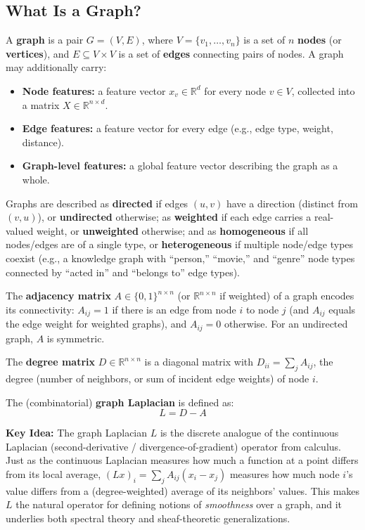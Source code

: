 \documentclass[12pt,a4paper]{article}
\begin{document}
\subsection{What Is a Graph?}

\begin{definition}
A \textbf{graph} is a pair $G = (V, E)$, where $V = \{v_1, \ldots, v_n\}$ is a set of $n$ \textbf{nodes} (or \textbf{vertices}), and $E \subseteq V \times V$ is a set of \textbf{edges} connecting pairs of nodes. A graph may additionally carry:
\begin{itemize}
    \item \textbf{Node features:} a feature vector $x_v \in \mathbb{R}^d$ for every node $v \in V$, collected into a matrix $X \in \mathbb{R}^{n \times d}$.
    \item \textbf{Edge features:} a feature vector for every edge (e.g., edge type, weight, distance).
    \item \textbf{Graph-level features:} a global feature vector describing the graph as a whole.
\end{itemize}
\end{definition}

Graphs are described as \textbf{directed} if edges $(u,v)$ have a direction (distinct from $(v,u)$), or \textbf{undirected} otherwise; as \textbf{weighted} if each edge carries a real-valued weight, or \textbf{unweighted} otherwise; and as \textbf{homogeneous} if all nodes/edges are of a single type, or \textbf{heterogeneous} if multiple node/edge types coexist (e.g., a knowledge graph with ``person,'' ``movie,'' and ``genre'' node types connected by ``acted in'' and ``belongs to'' edge types).

\begin{definition}
The \textbf{adjacency matrix} $A \in \{0,1\}^{n\times n}$ (or $\mathbb{R}^{n\times n}$ if weighted) of a graph encodes its connectivity: $A_{ij} = 1$ if there is an edge from node $i$ to node $j$ (and $A_{ij}$ equals the edge weight for weighted graphs), and $A_{ij}=0$ otherwise. For an undirected graph, $A$ is symmetric.

The \textbf{degree matrix} $D \in \mathbb{R}^{n\times n}$ is a diagonal matrix with $D_{ii} = \sum_j A_{ij}$, the degree (number of neighbors, or sum of incident edge weights) of node $i$.

The (combinatorial) \textbf{graph Laplacian} is defined as:
\[
L = D - A
\]
\end{definition}

\textbf{Key Idea:} The graph Laplacian $L$ is the discrete analogue of the continuous Laplacian (second-derivative / divergence-of-gradient) operator from calculus. Just as the continuous Laplacian measures how much a function at a point differs from its local average, $(Lx)_i = \sum_j A_{ij}(x_i - x_j)$ measures how much node $i$'s value differs from a (degree-weighted) average of its neighbors' values. This makes $L$ the natural operator for defining notions of \emph{smoothness} over a graph, and it underlies both spectral theory and sheaf-theoretic generalizations.
\end{document}

